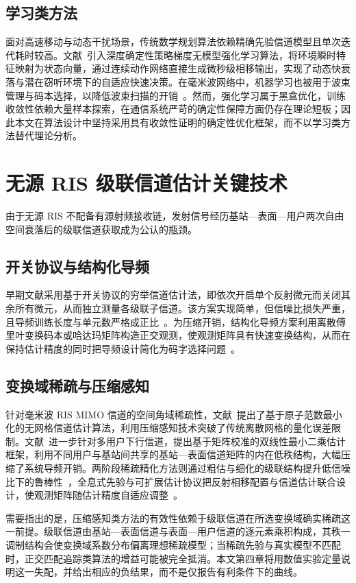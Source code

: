 \subsection{学习类方法}
面对高速移动与动态干扰场景，传统数学规划算法依赖精确先验信道模型且单次迭代耗时较高。文献~\cite{yang2021deep}引入深度确定性策略梯度无模型强化学习算法，将环境瞬时特征映射为状态向量，通过连续动作网络直接生成微秒级相移输出，实现了动态快衰落与潜在窃听环境下的自适应快速决策。在毫米波网络中，机器学习也被用于波束管理与码本选择，以降低波束扫描的开销~\cite{jia2020ris}。然而，强化学习属于黑盒优化，训练收敛性依赖大量样本探索，在通信系统严苛的确定性保障方面仍存在理论短板；因此本文在算法设计中坚持采用具有收敛性证明的确定性优化框架，而不以学习类方法替代理论分析。

\section{无源 RIS 级联信道估计关键技术}

由于无源 RIS 不配备有源射频接收链，发射信号经历基站—表面—用户两次自由空间衰落后的级联信道获取成为公认的瓶颈。

\subsection{开关协议与结构化导频}
早期文献采用基于开关协议的穷举信道估计法，即依次开启单个反射微元而关闭其余所有微元，从而独立测量各级联子信道。该方案实现简单，但信噪比损失严重，且导频训练长度与单元数严格成正比~\cite{mao2021ris}。为压缩开销，结构化导频方案利用离散傅里叶变换码本或哈达玛矩阵构造正交观测，使观测矩阵具有快速变换结构，从而在保持估计精度的同时把导频设计简化为码字选择问题~\cite{hongyun2024ris}。

\subsection{变换域稀疏与压缩感知}
针对毫米波 RIS MIMO 信道的空间角域稀疏性，文献~\cite{he2021channel}提出了基于原子范数最小化的无网格信道估计算法，利用压缩感知技术突破了传统离散网格的量化误差限制。文献~\cite{liu2020matrix}进一步针对多用户下行信道，提出基于矩阵校准的双线性最小二乘估计框架，利用不同用户与基站间共享的基站—表面信道矩阵的内在低秩结构，大幅压缩了系统导频开销。两阶段稀疏精化方法则通过粗估与细化的级联结构提升低信噪比下的鲁棒性~\cite{ma2026ris}，全息式先验与可扩展估计协议把反射相移配置与信道估计联合设计，使观测矩阵随估计精度自适应调整~\cite{an2022ris,yang2025ris}。

需要指出的是，压缩感知类方法的有效性依赖于级联信道在所选变换域确实稀疏这一前提。级联信道由基站—表面信道与表面—用户信道的逐元素乘积构成，其秩一调制结构会使变换域系数分布偏离理想稀疏模型；当稀疏先验与真实模型不匹配时，正交匹配追踪类算法的增益可能被完全抵消。本文第四章将用数值实验定量说明这一失配，并给出相应的负结果，而不是仅报告有利条件下的曲线。

